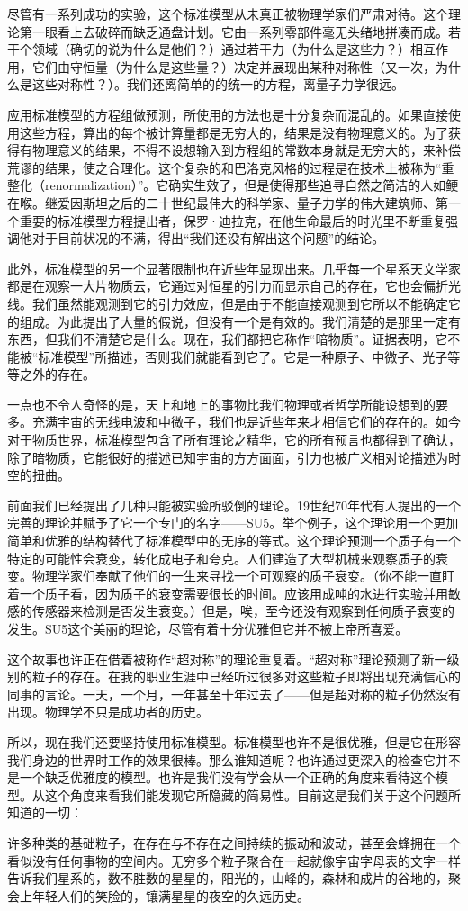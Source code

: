     尽管有一系列成功的实验，这个标准模型从未真正被物理学家们严肃对待。这个理论第一眼看上去破碎而缺乏通盘计划。它由一系列零部件毫无头绪地拼凑而成。若干个领域（确切的说为什么是他们？）通过若干力（为什么是这些力？）相互作用，它们由守恒量（为什么是这些量？）决定并展现出某种对称性（又一次，为什么是这些对称性？）。我们还离简单的的统一的方程，离量子力学很远。

   应用标准模型的方程组做预测，所使用的方法也是十分复杂而混乱的。如果直接使用这些方程，算出的每个被计算量都是无穷大的，结果是没有物理意义的。为了获得有物理意义的结果，不得不设想输入到方程组的常数本身就是无穷大的，来补偿荒谬的结果，使之合理化。这个复杂的和巴洛克风格的过程是在技术上被称为“重整化（renormalization）”。它确实生效了，但是使得那些追寻自然之简洁的人如鲠在喉。继爱因斯坦之后的二十世纪最伟大的科学家、量子力学的伟大建筑师、第一个重要的标准模型方程提出者，保罗·迪拉克，在他生命最后的时光里不断重复强调他对于目前状况的不满，得出“我们还没有解出这个问题”的结论。

   此外，标准模型的另一个显著限制也在近些年显现出来。几乎每一个星系天文学家都是在观察一大片物质云，它通过对恒星的引力而显示自己的存在，它也会偏折光线。我们虽然能观测到它的引力效应，但是由于不能直接观测到它所以不能确定它的组成。为此提出了大量的假说，但没有一个是有效的。我们清楚的是那里一定有东西，但我们不清楚它是什么。现在，我们都把它称作“暗物质”。证据表明，它不能被“标准模型”所描述，否则我们就能看到它了。它是一种原子、中微子、光子等等之外的存在。

   一点也不令人奇怪的是，天上和地上的事物比我们物理或者哲学所能设想到的要多。充满宇宙的无线电波和中微子，我们也是近些年来才相信它们的存在的。如今对于物质世界，标准模型包含了所有理论之精华，它的所有预言也都得到了确认，除了暗物质，它能很好的描述已知宇宙的方方面面，引力也被广义相对论描述为时空的扭曲。

   前面我们已经提出了几种只能被实验所驳倒的理论。19世纪70年代有人提出的一个完善的理论并赋予了它一个专门的名字——SU5。举个例子，这个理论用一个更加简单和优雅的结构替代了标准模型中的无序的等式。这个理论预测一个质子有一个特定的可能性会衰变，转化成电子和夸克。人们建造了大型机械来观察质子的衰变。物理学家们奉献了他们的一生来寻找一个可观察的质子衰变。（你不能一直盯着一个质子看，因为质子的衰变需要很长的时间。应该用成吨的水进行实验并用敏感的传感器来检测是否发生衰变。）但是，唉，至今还没有观察到任何质子衰变的发生。SU5这个美丽的理论，尽管有着十分优雅但它并不被上帝所喜爱。

   这个故事也许正在借着被称作“超对称”的理论重复着。“超对称”理论预测了新一级别的粒子的存在。在我的职业生涯中已经听过很多对这些粒子即将出现充满信心的同事的言论。一天，一个月，一年甚至十年过去了——但是超对称的粒子仍然没有出现。物理学不只是成功者的历史。

   所以，现在我们还要坚持使用标准模型。标准模型也许不是很优雅，但是它在形容我们身边的世界时工作的效果很棒。那么谁知道呢？也许通过更深入的检查它并不是一个缺乏优雅度的模型。也许是我们没有学会从一个正确的角度来看待这个模型。从这个角度来看我们能发现它所隐藏的简易性。目前这是我们关于这个问题所知道的一切：

   许多种类的基础粒子，在存在与不存在之间持续的振动和波动，甚至会蜂拥在一个看似没有任何事物的空间内。无穷多个粒子聚合在一起就像宇宙字母表的文字一样告诉我们星系的，数不胜数的星星的，阳光的，山峰的，森林和成片的谷地的，聚会上年轻人们的笑脸的，镶满星星的夜空的久远历史。

\noindent
